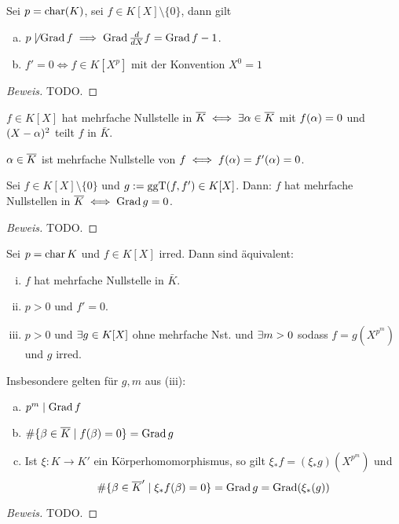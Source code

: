 \documentclass[a4paper]{report}
\begin{document}
\begin{lemm}Sei $p = \operatorname{char}(K)$, sei $f \in K[X] \setminus \{0\}$, dann gilt
  \begin{enumerate}[(a)]
    \item $p \not \mid  \operatorname{Grad} f \implies \operatorname{Grad} \frac d{dX} f = \operatorname{Grad} f - 1$.
    \item $f' = 0 \iff f \in K[X^{p}]$ mit der Konvention $X^{0} = 1$
  \end{enumerate}
\begin{proof}[Beweis]
TODO.
\end{proof}
\end{lemm}

\begin{defi}
$f \in K[X]$ hat mehrfache Nullstelle in $\overline K \iff \exists \alpha \in \overline K$ mit $f(\alpha) = 0$ und $(X - \alpha)^2$ teilt $f$ in $\bar K$.
\end{defi}
\begin{bem}[Übung]
$\alpha \in \overline K$ ist mehrfache Nullstelle von $f \iff f(\alpha) = f'(\alpha) = 0$.
\end{bem}
\begin{prop} Sei $f \in K[X] \setminus \{0\}$ und $g:= \operatorname{ggT}(f, f') \in K[X]$. Dann: $f$ hat mehrfache Nullstellen in $\overline K \iff \operatorname{Grad} g = 0$.
  \begin{proof}[Beweis]
TODO.
  \end{proof}
\end{prop}
\begin{kor}
  Sei $p = \operatorname{char} K$ und $f \in K[X]$ irred. Dann sind äquivalent:
  \begin{enumerate}[(i)]
    \item $f$ hat mehrfache Nullstelle in $\bar K$.
    \item $p > 0$ und $f' = 0$.
    \item $p > 0$ und $\exists g \in K[X]$ ohne mehrfache Nst. und $\exists m > 0$ sodass $f = g(X^{p^m})$ und $g$ irred.
  \end{enumerate}
  Insbesondere gelten für $g, m$ aus (iii):
  \begin{enumerate}[(a)]
    \item $p^{m} \mid \operatorname{Grad} f$
    \item $\#\{\beta \in \overline K \mid f(\beta) = 0\} = \operatorname{Grad} g$
    \item Ist $\xi : K \to K'$ ein Körperhomomorphismus, so gilt $\xi_{*}f = (\xi_{*}g)(X^{p^{m}})$ und
          \[\# \{\beta \in \overline K' \mid \xi_{*}f(\beta) = 0\} = \operatorname{Grad} g = \operatorname{Grad}(\xi_{*}(g))\]
  \end{enumerate}
\begin{proof}[Beweis]
TODO.
\end{proof}
\end{kor}
\end{document}

